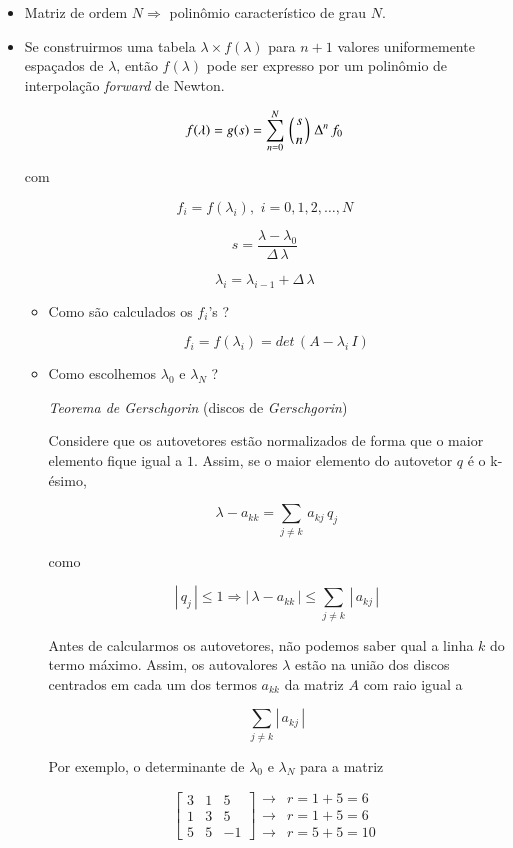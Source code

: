 \begin{itemize}

\item Matriz de ordem $ N \Rightarrow $ polinômio característico de grau $ N $.

\item Se construirmos uma tabela $ \lambda \times f(\lambda) $ para $ n + 1 $ valores uniformemente espaçados de $ \lambda $, então $ f(\lambda) $ pode ser expresso por um polinômio de interpolação \textit{forward} de Newton.

\[
 f(\lambda) = g(s) = \sum_{n=0}^N \, \left(s \atop n\right) \, \Delta^n \, f_0
\]

com

\[
 f_i = f(\lambda_i), \, \, i = 0, 1, 2, \ldots, N
\]

\[
 s = \frac{\lambda - \lambda_0}{\Delta \, \lambda}
\]

\[
 \lambda_i = \lambda_{i-1} + \Delta \, \lambda
\]


\begin{itemize}

\item Como são calculados os $ f_i $'s ?

\[
 f_i = f(\lambda_i) = det \, (A - \lambda_i \, I)
\]

\item Como escolhemos $ \lambda_0 $ e $ \lambda_N $ ?

\textit{Teorema de Gerschgorin} (discos de \textit{Gerschgorin})

Considere que os autovetores estão normalizados de forma que o maior elemento fique igual a $ 1 $. Assim, se o maior elemento do autovetor $ q $ é o k-ésimo,

\[
 \lambda - a_{kk} = \sum_{j \neq k} \, a_{kj} \, q_j
\]

como

\[
 | \, q_j \, | \leq 1 \Rightarrow | \, \lambda - a_{kk} \, | \leq \displaystyle \sum_{j \neq k} \, | \, a_{kj} \, |
\]

Antes de calcularmos os autovetores, não podemos saber qual a linha $ k $ do termo máximo. Assim, os autovalores $ \lambda $ estão na união dos discos centrados em cada um dos termos $ a_{kk} $ da matriz $ A $ com raio igual a

\[
 \sum_{j \neq k} | \, a_{kj} \, |
\]

Por exemplo, o determinante de $ \lambda_0 $ e $ \lambda_N $ para a matriz

\[
 \left[
  \begin{array}{rrr}
   3 & 1 & 5\\
   1 & 3 & 5\\
   5 & 5 & -1
  \end{array}
 \right]
  \begin{array}{ll}
   \rightarrow & r = 1 + 5 = 6\\
   \rightarrow & r = 1 + 5 = 6\\
   \rightarrow & r = 5 + 5 = 10
  \end{array}
\]


\end{itemize}
\end{itemize}

